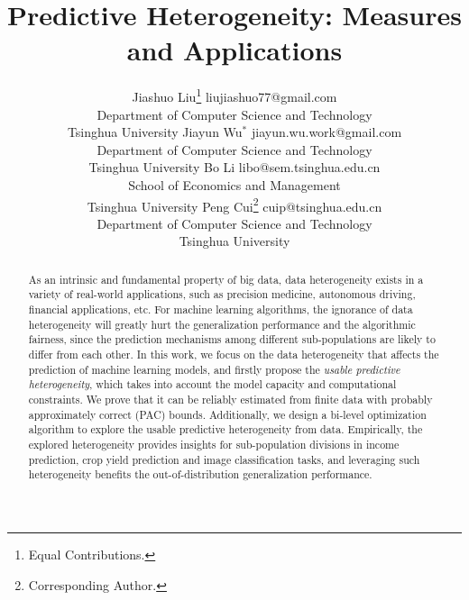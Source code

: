 \documentclass[twoside,11pt]{article}
\begin{document}
\title{Predictive Heterogeneity: Measures and Applications}

\author{\name Jiashuo Liu\thanks{Equal Contributions.} \email liujiashuo77@gmail.com \\
       \addr Department of Computer Science and Technology\\
       Tsinghua University
       \AND
       \name Jiayun Wu$^*$ \email jiayun.wu.work@gmail.com \\
       \addr Department of Computer Science and Technology\\
		Tsinghua University
		\AND 
	   \name Bo Li \email libo@sem.tsinghua.edu.cn\\
	   \addr School of Economics and Management\\
	   Tsinghua University
	   \AND 
	   \name Peng Cui\thanks{Corresponding Author.} \email cuip@tsinghua.edu.cn\\
	   \addr Department of Computer Science and Technology\\
	   Tsinghua University
}


\maketitle

\begin{abstract}%
As an intrinsic and fundamental property of big data, data heterogeneity exists in a variety of real-world applications, such as precision medicine, autonomous driving, financial applications, etc.
For machine learning algorithms, the ignorance of data heterogeneity will greatly hurt the generalization performance and the algorithmic fairness, since the prediction mechanisms among different sub-populations are likely to differ from each other.
In this work, we focus on the data heterogeneity that affects the prediction of machine learning models, and firstly propose the \emph{usable predictive heterogeneity}, which takes into account the model capacity and computational constraints.
We prove that it can be reliably estimated from finite data with probably approximately correct (PAC) bounds.
Additionally, we design a bi-level optimization algorithm to explore the usable predictive heterogeneity from data.
Empirically, the explored heterogeneity provides insights for sub-population divisions in income prediction, crop yield prediction and image classification tasks, and leveraging such heterogeneity benefits the out-of-distribution generalization performance.
\end{abstract}
\end{document}
